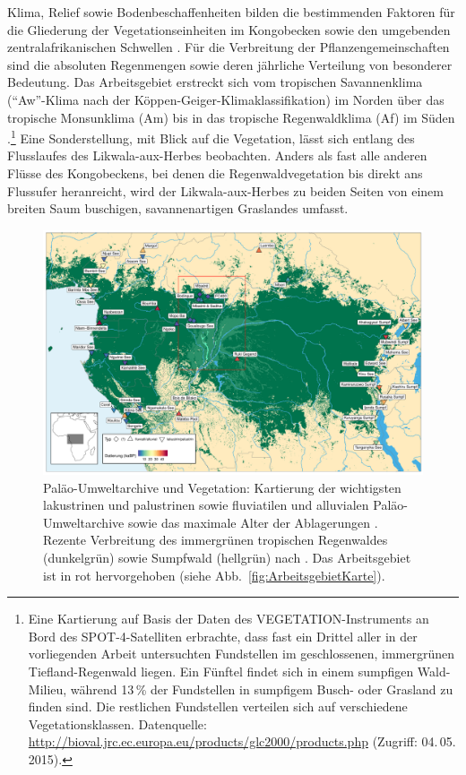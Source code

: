 \begin{multicols}{2}
Klima, Relief sowie Bodenbeschaffenheiten bilden die bestimmenden Faktoren für die Gliederung der Vegetationseinheiten im Kongobecken sowie den umgebenden zentralafrikanischen Schwellen \parencite[82]{Runge.2001}. Für die Verbreitung der Pflanzengemeinschaften sind die absoluten Regenmengen sowie deren jährliche Verteilung von besonderer Bedeutung. Das Arbeitsgebiet erstreckt sich vom tropischen Savannenklima (\enquote{Aw}-Klima nach der Köppen-Geiger-Klimaklassifikation) im Norden über das tropische Monsunklima (Am) bis in das tropische Regenwaldklima (Af) im Süden \parencite{Peel.2007}.\footnote{Eine Kartierung auf Basis der Daten des VEGETATION-Instruments an Bord des SPOT-4-Satelliten \parencites{Mayaux.2003}[19]{Jones.2013} erbrachte, dass fast ein Drittel aller in der vorliegenden Arbeit untersuchten Fundstellen im geschlossenen, immergrünen Tiefland-Regenwald liegen. Ein Fünftel findet sich in einem sumpfigen Wald-Milieu, während 13\,\% der Fundstellen in sumpfigem Busch- oder Grasland zu finden sind. Die restlichen Fundstellen verteilen sich auf verschiedene Vegetationsklassen. Datenquelle: \url{http://bioval.jrc.ec.europa.eu/products/glc2000/products.php} (Zugriff: 04.\,05.\,2015).} Eine Sonderstellung, mit Blick auf die Vegetation, lässt sich entlang des Flusslaufes des \mbox{Likwala}-\mbox{aux}-\mbox{Herbes} beobachten. Anders als fast alle anderen Flüsse des Kongobeckens, bei denen die Regenwaldvegetation bis direkt ans Flussufer heranreicht, wird der \mbox{Likwala}-\mbox{aux}-\mbox{Herbes} zu beiden Seiten von einem breiten Saum buschigen, savannenartigen Graslandes umfasst.

\begin{figure}[!tb]
	\centering
	\includegraphics[width=\textwidth]{fig/Ch1_Fig2_PalaoUmwelt.pdf}
	\caption{Paläo-Umweltarchive und Vegetation: Kartierung der wichtigsten lakustrinen und palustrinen sowie fluviatilen und alluvialen Paläo-Umweltarchive sowie das maximale Alter der Ablagerungen \parencites[nach][]{Brncic.2007}{Brncic.2009}[43 Abb.~16, 46 Abb.~17]{Sangen.2009}{Kiahtipes.2011}{Kiahtipes.2016}. Rezente Verbreitung des immergrünen tropischen Regenwaldes (dunkelgrün) sowie Sumpfwald (hellgrün) nach \textcite{Mayaux.2003}. Das Arbeitsgebiet ist in rot hervorgehoben (siehe Abb.~\ref{fig:ArbeitsgebietKarte}).}
	\label{fig:PalaeoumweltArch_Karte}
\end{figure}


\end{multicols}
